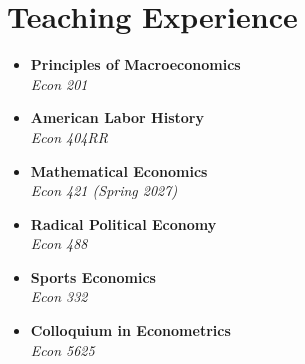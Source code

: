 \documentclass[letterpaper,11pt]{article}
\begin{document}
\section{Teaching Experience}
\vspace{3pt}
\begin{minipage}[t]{0.48\textwidth}
  \begin{itemize}[leftmargin=0.15in, label={\textcolor{accentcolor}{\textbullet}}]
    \item \textbf{\color{primarycolor}Principles of Macroeconomics} \\
          \textit{\color{textgray}Econ 201}
    \item \textbf{\color{primarycolor}American Labor History} \\
          \textit{\color{textgray}Econ 404RR}
    \item \textbf{\color{primarycolor}Mathematical Economics} \\
          \textit{\color{textgray}Econ 421 \textmd{(Spring 2027)}}
  \end{itemize}
\end{minipage}
\hfill
\begin{minipage}[t]{0.48\textwidth}
  \begin{itemize}[leftmargin=0.15in, label={\textcolor{accentcolor}{\textbullet}}]
    \item \textbf{\color{primarycolor}Radical Political Economy} \\
          \textit{\color{textgray}Econ 488}
    \item \textbf{\color{primarycolor}Sports Economics} \\
          \textit{\color{textgray}Econ 332}
    \item \textbf{\color{primarycolor}Colloquium in Econometrics} \\
          \textit{\color{textgray}Econ 5625}
  \end{itemize}
\end{minipage}

\end{document}
